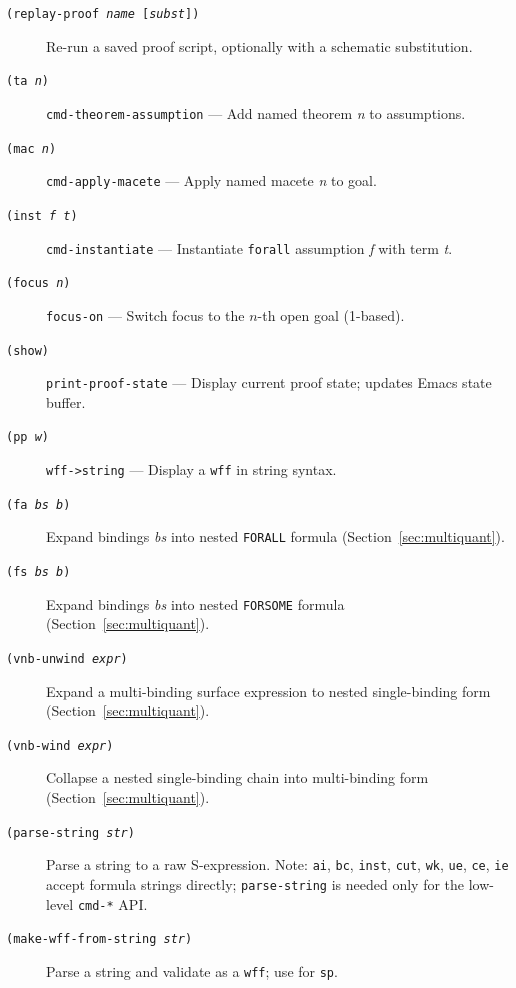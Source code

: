 \documentclass{amsbook}[openany]
\theoremstyle{definition}
\theoremstyle{remark}
\theoremstyle{remark}
\begin{document}
\begin{description}
\item[\texttt{(replay-proof \textit{name} [\textit{subst}])}]
  Re-run a saved proof script, optionally with a schematic substitution.

\item[\texttt{(ta \textit{n})}]
  \texttt{cmd-theorem-assumption} --- Add named theorem \textit{n} to
  assumptions.

\item[\texttt{(mac \textit{n})}]
  \texttt{cmd-apply-macete} --- Apply named macete \textit{n} to goal.

\item[\texttt{(inst \textit{f t})}]
  \texttt{cmd-instantiate} --- Instantiate \texttt{forall} assumption
  \textit{f} with term \textit{t}.

\item[\texttt{(focus \textit{n})}]
  \texttt{focus-on} --- Switch focus to the $n$-th open goal (1-based).

\item[\texttt{(show)}]
  \texttt{print-proof-state} --- Display current proof state; updates
  Emacs state buffer.

\item[\texttt{(pp \textit{w})}]
  \texttt{wff->string} --- Display a \texttt{wff} in string syntax.

\item[\texttt{(fa \textit{bs b})}]
  Expand bindings \textit{bs} into nested \texttt{FORALL} formula
  (Section~\ref{sec:multiquant}).

\item[\texttt{(fs \textit{bs b})}]
  Expand bindings \textit{bs} into nested \texttt{FORSOME} formula
  (Section~\ref{sec:multiquant}).

\item[\texttt{(vnb-unwind \textit{expr})}]
  Expand a multi-binding surface expression to nested single-binding form
  (Section~\ref{sec:multiquant}).

\item[\texttt{(vnb-wind \textit{expr})}]
  Collapse a nested single-binding chain into multi-binding form
  (Section~\ref{sec:multiquant}).

\item[\texttt{(parse-string \textit{str})}]
  Parse a string to a raw S-expression.  Note: \texttt{ai}, \texttt{bc},
  \texttt{inst}, \texttt{cut}, \texttt{wk}, \texttt{ue}, \texttt{ce},
  \texttt{ie} accept formula strings directly; \texttt{parse-string} is
  needed only for the low-level \texttt{cmd-*} API.

\item[\texttt{(make-wff-from-string \textit{str})}]
  Parse a string and validate as a \texttt{wff}; use for \texttt{sp}.

\end{description}
\end{document}
